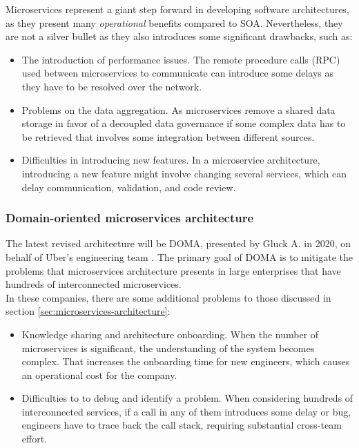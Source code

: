 \documentclass[english, 12pt, a4paper, sci, utf8, a-1b, online]{aaltothesis}
\begin{document}
Microservices represent a giant step forward in developing software architectures, as they present many \textit{operational} benefits compared to SOA. Nevertheless, they are not a silver bullet as they also introduces some significant drawbacks, such as:

\begin{itemize}
    \item The introduction of performance issues. The remote procedure calls (RPC) used between microservices to communicate can introduce some delays as they have to be resolved over the network.
    \item Problems on the data aggregation.  As microservices remove a shared data storage in favor of a decoupled data governance if some complex data has to be retrieved that involves some integration between different sources.
    \item Difficulties in introducing new features. In a microservice architecture, introducing a new feature might involve changing several services, which can delay communication, validation, and code review.
\end{itemize}

\subsubsection{Domain-oriented microservices architecture}
\label{sec:domain-oriented-microservices-architecture}


The latest revised architecture will be DOMA, presented by Gluck A. in 2020, on behalf of Uber's engineering team \cite{DOMAUber}. The primary goal of DOMA is to mitigate the problems that microservices architecture presents in large enterprises that have hundreds of interconnected microservices.\\

In these companies, there are some additional problems to those discussed in section \ref{sec:microservices-architecture}:

\begin{itemize}
    \item Knowledge sharing and architecture onboarding. When the number of microservices is significant, the understanding of the system becomes complex. That increases the onboarding time for new engineers, which causes an operational cost for the company.
    \item Difficulties to to debug and identify a problem. When considering hundreds of interconnected services, if a call in any of them introduces some delay or bug, engineers have to trace back the call stack, requiring substantial cross-team effort.
\end{itemize}
\end{document}
